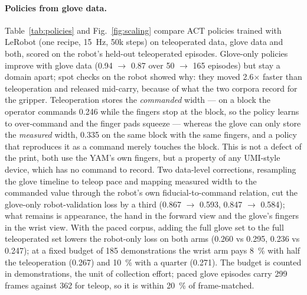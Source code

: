 \documentclass{article}
\begin{document}
\paragraph{Policies from glove data.}
Table~\ref{tab:policies} and Fig.~\ref{fig:scaling} compare ACT policies \citep{zhao2023act} trained with LeRobot \citep{lerobot2024} (one recipe, \SI{15}{Hz}, 50k steps) on teleoperated data, glove data and both, scored on the robot's held-out teleoperated episodes. Glove-only policies improve with glove data (0.94 $\to$ 0.87 over 50 $\to$ 165 episodes) but stay a domain apart; spot checks on the robot showed why: they moved 2.6$\times$ faster than teleoperation and released mid-carry, because of what the two corpora record for the gripper. Teleoperation stores the \emph{commanded} width --- on a block the operator commands 0.246 while the fingers stop at the block, so the policy learns to over-command and the finger pads squeeze --- whereas the glove can only store the \emph{measured} width, 0.335 on the same block with the same fingers, and a policy that reproduces it as a command merely touches the block. This is not a defect of the print, both use the YAM's own fingers, but a property of any UMI-style device, which has no command to record. Two data-level corrections, resampling the glove timeline to teleop pace and mapping measured width to the commanded value through the robot's own fiducial-to-command relation, cut the glove-only robot-validation loss by a third (0.867 $\to$ 0.593, 0.847 $\to$ 0.584); what remains is appearance, the hand in the forward view and the glove's fingers in the wrist view. With the paced corpus, adding the full glove set to the full teleoperated set lowers the robot-only loss on both arms (0.260 vs 0.295, 0.236 vs 0.247); at a fixed budget of 185 demonstrations the wrist arm pays \SI{8}{\percent} with half the teleoperation (0.267) and \SI{10}{\percent} with a quarter (0.271). The budget is counted in demonstrations, the unit of collection effort; paced glove episodes carry \num{299} frames against \num{362} for teleop, so it is within \SI{20}{\percent} of frame-matched.
\end{document}

